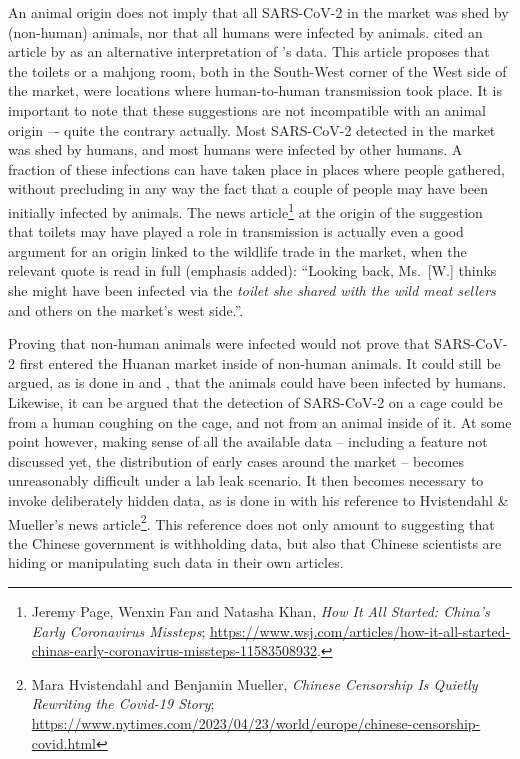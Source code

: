 \documentclass[11pt]{article}
\def \sct {\mbox{SARS-CoV-2}}
\begin{document}
An animal origin does not imply that all \sct{} in the market was shed by (non-human) animals, nor that all humans were infected by animals.  cited an article by \citet{CORibera2022ER} as an alternative interpretation of \citet{Liu2022RS}'s data. This article proposes that the toilets or a mahjong room, both in the South-West corner of the West side of the market, were locations where human-to-human transmission took place. It is important to note that these suggestions are not incompatible with an animal origin –- quite the contrary actually. Most \sct{} detected in the market was shed by humans, and most humans were infected by other humans. A fraction of these infections can have taken place in places where people gathered, without precluding in any way the fact that a couple of people may have been initially infected by animals. The news article\footnote{ 
Jeremy Page, Wenxin Fan and Natasha Khan, \textit{How It All Started: China's Early Coronavirus Missteps}; \url{https://www.wsj.com/articles/how-it-all-started-chinas-early-coronavirus-missteps-11583508932}.} at the origin of the suggestion that toilets may have played a role in transmission is actually even a good argument for an origin linked to the wildlife trade in the market, when the relevant quote is read in full (emphasis added): ``Looking back, Ms.\ [W.] thinks she might have been infected via the \textit{toilet she shared with the wild meat sellers} and others on the market's west side.''.

Proving that non-human animals were infected would not prove that \sct{} first entered the Huanan market inside of non-human animals. It could still be argued, as is done in \citet{Liu2023Nature} and \citet{Bloom2023VE}, that the animals could have been infected by humans. Likewise, it can be argued that the detection of \sct{} on a cage could be from a human coughing on the cage, and not from an animal inside of it. At some point however, making sense of all the available data -- including a feature not discussed yet, the distribution of early cases around the market \citep{Worobey2022Science} -- becomes unreasonably difficult under a lab leak scenario. It then becomes necessary to invoke deliberately hidden data, as is done in \citet{Bloom2023VE} with his reference to Hvistendahl \& Mueller's news article\footnote{Mara Hvistendahl and Benjamin Mueller, \textit{Chinese Censorship Is Quietly Rewriting the Covid-19 Story}; \url{https://www.nytimes.com/2023/04/23/world/europe/chinese-censorship-covid.html}}. This reference does not only amount to suggesting that the Chinese government is withholding data, but also that Chinese scientists are hiding or manipulating such data in their own articles. 
\end{document}
